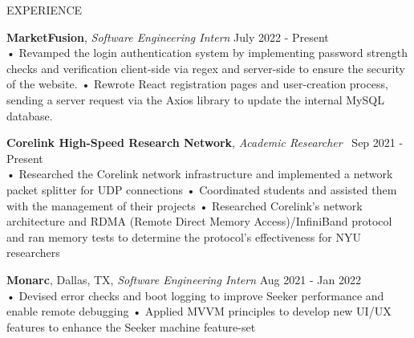 \documentclass{resume} %
\begin{document}
\begin{rSection}{EXPERIENCE}

\textbf{\bf MarketFusion}, {\emph{Software Engineering Intern}} \hfill July 2022 - Present\\
• Revamped the login authentication system by implementing password strength checks and verification client-side via regex and server-side to ensure the security of the website. \newline
• Rewrote React registration pages and user-creation process, sending a server request via the Axios library to update the internal MySQL database. \smallskip

\textbf{\bf Corelink High-Speed Research Network}, {\emph{Academic Researcher}} \ \hfill Sep 2021 - Present \\%
• Researched the Corelink network infrastructure and implemented a network packet splitter for UDP connections \newline
• Coordinated students and assisted them with the management of their projects \newline    
• Researched Corelink’s network architecture and RDMA (Remote Direct Memory Access)/InfiniBand protocol and ran memory tests to determine the protocol's effectiveness for NYU researchers

\textbf{\bf Monarc}, Dallas, TX, {\emph{Software Engineering Intern}} \hfill Aug 2021 - Jan 2022\\
• Devised error checks and boot logging to improve Seeker performance and enable remote debugging \newline
• Applied MVVM principles to develop new UI/UX features to enhance the Seeker machine feature-set \smallskip
\end{rSection} 
\end{document}
